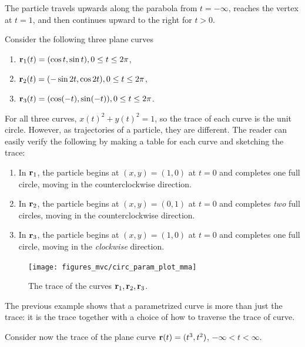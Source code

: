 \documentclass[12pt,letterpaper,reqno]{article}
\numberwithin{equation}{section}
\newcommand{\bbr}{{\bf r}}
\begin{document}
{{\begin{solution}
The particle travels upwards along the parabola from $t=-\infty$, reaches the vertex at $t=1$, and then continues upward to the right for $t>0$.
\end{solution}}

\newpage

\begin{example}\label{ex:unit_circ}
Consider the following three plane curves 
\begin{enumerate}[(1)]
	\item $\bbr_1(t)=(\cos t, \sin t), 0 \leq t \leq 2\pi$, 
	\item $\bbr_2(t)=(-\sin 2t, \cos 2t), 0 \leq t \leq 2\pi$,
	\item $\bbr_3(t)=(\cos(-t), \sin(-t)), 0 \leq t \leq 2\pi$.
\end{enumerate}	
For all three curves, $x(t)^2+y(t)^2=1$, so the trace of each curve is the unit circle. However, as trajectories of a particle, they are different. The reader can easily verify the following by making a table for each curve and sketching the trace:
\begin{enumerate}[(1)]
	\item In $\bbr_1$, the particle begins at $(x,y)=(1,0)$ at $t=0$ and completes one full circle, moving in the counterclockwise direction.
	\item In $\bbr_2$, the particle begins at $(x,y)=(0,1)$ at $t=0$ and completes \emph{two} full circles, moving in the counterclockwise direction.
	\item In $\bbr_3$, the particle begins at $(x,y)=(1,0)$ at $t=0$ and completes one full circle, moving in the \emph{clockwise} direction.
\end{enumerate}
\begin{figure}[h]
	\begin{center}
		\texttt{[image: figures\_mvc/circ\_param\_plot\_mma]}
	\end{center}
	\caption{The trace of the curves $\bbr_1,\bbr_2,\bbr_3$.}
\end{figure}
\end{example}

\newpage 

The previous example shows that a parametrized curve is more than just the trace: it is the trace together with a choice of how to traverse the trace of curve.

\begin{example}
Consider now the trace of the plane curve $\bbr(t)=(t^3,t^2)$, $-\infty<t<\infty$.


\end{example}}
\end{document}
